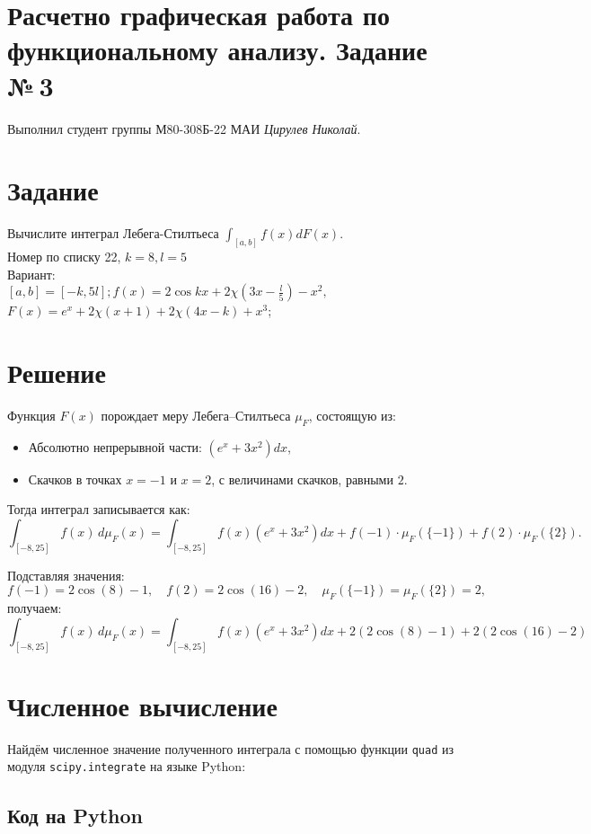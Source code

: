 \documentclass{article}
\begin{document}
\section*{Расчетно графическая работа по функциональному анализу. Задание №\,3}

Выполнил студент группы М80-308Б-22 МАИ \textit{Цирулев Николай}.

\section{Задание}
Вычислите интеграл Лебега-Стилтьеса $\int_{[a, b]} f(x) d F(x)$.
\\
Номер по списку 22, $k = 8, l = 5$\\
Вариант: \\
$[a, b]=[-k, 5 l] ; f(x)=2 \cos k x+2 \chi\left(3 x-\frac{l}{5}\right)-x^2,$\\
$ F(x)=e^x+2 \chi(x+1)+2 \chi(4 x-k)+x^3$;

\section{Решение}

Функция $F(x)$ порождает меру Лебега–Стилтьеса $\mu_F$, состоящую из:

\begin{itemize}
    \item Абсолютно непрерывной части: $(e^x + 3x^2) dx$,
    \item Скачков в точках $x = -1$ и $x = 2$, с величинами скачков, равными $2$.
\end{itemize}

Тогда интеграл записывается как:
\[
\int_{[-8, 25]} f(x) \, d\mu_F(x) =
\int_{[-8, 25]} f(x)(e^x + 3x^2) dx + f(-1) \cdot \mu_F(\{-1\}) + f(2) \cdot \mu_F(\{2\}).
\]

Подставляя значения:
\[
f(-1) = 2 \cos(8) - 1,\quad f(2) = 2 \cos(16) - 2,\quad \mu_F(\{-1\}) = \mu_F(\{2\}) = 2,
\]
получаем:
\[
\boxed{
\int_{[-8, 25]} f(x) \, d\mu_F(x) =
\int_{[-8, 25]} f(x)(e^x + 3x^2) dx + 2(2 \cos(8) - 1) + 2(2 \cos(16) - 2)
}
\]

\section{Численное вычисление}
Найдём численное значение полученного интеграла с помощью функции \texttt{quad} из модуля \texttt{scipy.integrate} на языке Python:
\subsection{Код на Python}
\end{document}
